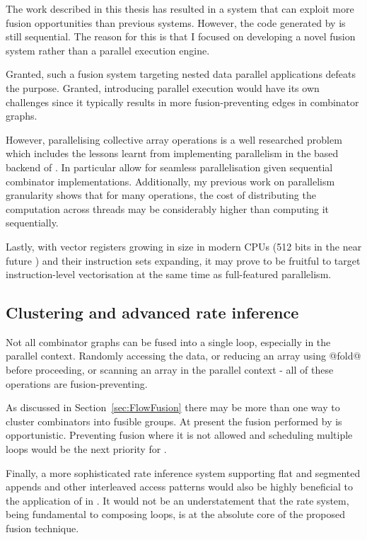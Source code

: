 \documentclass[preamble.tex]{subfiles}
\begin{document}
The work described in this thesis has resulted in a system that can exploit more fusion opportunities than previous systems. However, the code generated by \LiveFusion is still sequential. The reason for this is that I focused on developing a novel fusion system rather than a parallel execution engine.

Granted, such a fusion system targeting nested data parallel applications defeats the purpose. Granted, introducing parallel execution would have its own challenges since it typically results in more fusion-preventing edges in combinator graphs.

However, parallelising collective array operations is a well researched problem which includes the lessons learnt from implementing parallelism in the \StreamFusion based backend of \DPH. In particular  \cite{CLP+07} allow for seamless parallelisation given sequential combinator implementations. Additionally, my previous work on parallelism granularity shows that for many operations, the cost of distributing the computation across threads may be considerably higher than computing it sequentially.

Lastly, with vector registers growing in size in modern CPUs (512 bits in the near future \cite{IntelISA}) and their instruction sets expanding, it may prove to be fruitful to target instruction-level vectorisation at the same time as full-featured parallelism.



\subsection{Clustering and advanced rate inference}

Not all combinator graphs can be fused into a single loop, especially in the parallel context. Randomly accessing the data, or reducing an array using @fold@ before proceeding, or scanning an array in the parallel context - all of these operations are fusion-preventing.

As discussed in Section~\ref{sec:FlowFusion} there may be more than one way to cluster combinators into fusible groups. At present the fusion performed by \LiveFusion is opportunistic. Preventing fusion where it is not allowed and scheduling multiple loops would be the next priority for \LiveFusion.

Finally, a more sophisticated rate inference system supporting flat and segmented appends and other interleaved access patterns would also be highly beneficial to the application of \LiveFusion in \DPH. It would not be an understatement that the rate system, being fundamental to composing loops, is at the absolute core of the proposed fusion technique.






\IfNotCompilingAll{}
\end{document}
